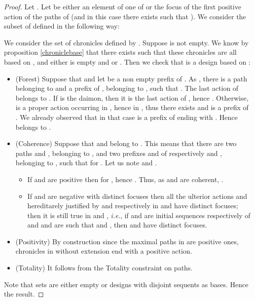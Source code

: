 \documentclass{LMCS}
\def\ie{{\em i.e.}}
\begin{document}
 \begin{proof}
Let .
Let  be either an element of one of  or the focus of the first positive action of the paths of  (and in this case there exists  such that ). We consider the subset  of  defined in the following way: 
 
 We consider the set of chronicles defined by  .
Suppose  is not empty. We know by proposition \ref{chroniclebase} that there exists  such that these chronicles are all based on , and either  is empty and  or .
 Then  we check that  is a design based on :
\begin{itemize}
\item (Forest) Suppose that  and let  be a non empty prefix of . As , there is a path  belonging to  and a prefix   of , belonging to , such that . The last action  of  belongs to . 
If  is the daimon, then it is the last action of , hence .
Otherwise,  is a proper action occurring in , hence in , thus there exists  and  is a prefix of . We already observed that in that case  is a prefix of  ending with . Hence  belongs to . 

\item (Coherence) Suppose that  and  belong to . This means that there are two paths  and , belonging to , and two prefixes  and  of respectively  and , belonging to , such that  for . 
Let us note  and
.
\begin{itemize}[label=]
\item If  and  are positive then  for , hence . Thus, as  and   are coherent, .
\item If  and  are negative with distinct focuses  then all the ulterior actions  and  hereditarely justified by  and  respectively in  and   have distinct focuses; then it is still true in  and , \ie, if   and   are initial sequences respectively of  and  and are such that   and , then
 and  have distinct focuses. 
\end{itemize}

\item (Positivity) By construction since the maximal paths in  are positive ones, chronicles in  without extension end with a positive action.

\item (Totality) It follows from the Totality constraint on paths.
\end{itemize}
Note that sets  are either empty or designs with disjoint sequents as bases. Hence the result.
\end{proof}
 
\end{document}
